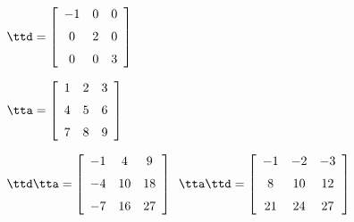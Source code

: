 {$\ttd = \left[ \begin {array}{ccc} -1&0&0\\\noalign{\medskip}0&2&0
\\\noalign{\medskip}0&0&3\end {array} \right]$

$\tta = \left[ \begin {array}{ccc} 1&2&3\\\noalign{\medskip}4&5&6
\\\noalign{\medskip}7&8&9\end {array} \right] $}
{$\ttd\tta= \left[ \begin {array}{ccc} -1&4&9\\\noalign{\medskip}-4&10&18
\\\noalign{\medskip}-7&16&27\end {array} \right]$\ 
$\tta\ttd = \left[ \begin {array}{ccc} -1&-2&-3\\\noalign{\medskip}8&10&12
\\\noalign{\medskip}21&24&27\end {array} \right] $
}



